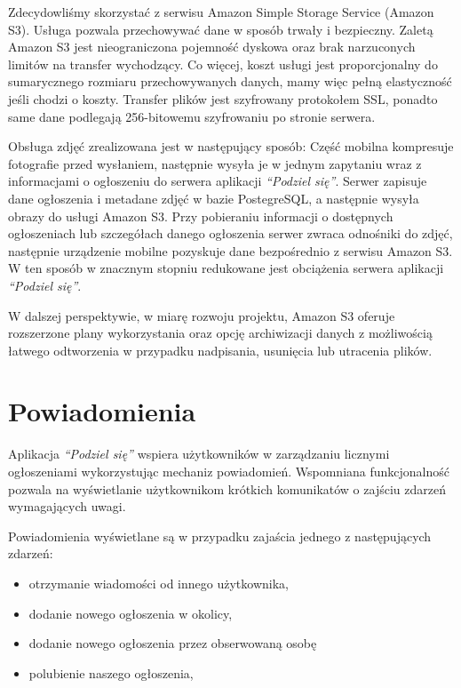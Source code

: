 \documentclass[licencjacka]{pracamgr}
\begin{document}
Zdecydowliśmy skorzystać z serwisu Amazon Simple Storage Service (Amazon S3). Usługa pozwala przechowywać dane w sposób trwały i bezpieczny. Zaletą Amazon S3 jest nieograniczona pojemność dyskowa oraz brak narzuconych limitów na transfer wychodzący. Co więcej, koszt usługi jest proporcjonalny do sumarycznego rozmiaru przechowywanych danych, mamy więc pełną elastyczność jeśli chodzi o koszty. Transfer plików jest szyfrowany protokołem SSL, ponadto same dane podlegają 256-bitowemu szyfrowaniu po stronie serwera.

Obsługa zdjęć zrealizowana jest w następujący sposób: Część mobilna kompresuje fotografie przed wysłaniem, następnie wysyła je w jednym zapytaniu wraz z informacjami o ogłoszeniu do serwera aplikacji \textit{``Podziel się''}. Serwer zapisuje dane ogłoszenia i metadane zdjęć w bazie PostegreSQL, a następnie wysyła obrazy do usługi Amazon S3. Przy pobieraniu informacji o dostępnych ogłoszeniach lub szczegółach danego ogłoszenia serwer zwraca odnośniki do zdjęć, następnie urządzenie mobilne pozyskuje dane bezpośrednio z serwisu Amazon S3. W ten sposób w znacznym stopniu redukowane jest obciążenia serwera aplikacji \textit{``Podziel się''}.

W dalszej perspektywie, w miarę rozwoju projektu, Amazon S3 oferuje rozszerzone plany wykorzystania oraz opcję archiwizacji danych z możliwością łatwego odtworzenia w przypadku nadpisania, usunięcia lub utracenia plików.

\section{Powiadomienia}

Aplikacja \textit{``Podziel się''} wspiera użytkowników w zarządzaniu licznymi ogłoszeniami wykorzystując mechaniz powiadomień. Wspomniana funkcjonalność pozwala na wyświetlanie użytkownikom krótkich komunikatów o zajściu zdarzeń wymagających uwagi.

Powiadomienia wyświetlane są w przypadku zajaścia jednego z następujących zdarzeń:
\begin{itemize}
\setlength\itemsep{-0.2em}
    \item otrzymanie wiadomości od innego użytkownika,
    \item dodanie nowego ogłoszenia w okolicy,
    \item dodanie nowego ogłoszenia przez obserwowaną osobę
    \item polubienie naszego ogłoszenia,
\end{itemize}{}
\end{document}
